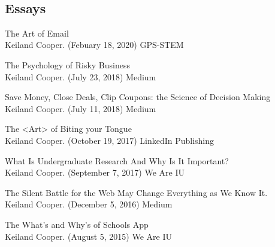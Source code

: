 \documentclass[10pt]{cooperCV2}
\begin{document}
%	






\needspace{\headerpush}
\myRule{\columnwidth}{1pt}\\

 
\subsection{Essays} 
\begin{etaremune}[itemindent=-1.5\bibhang, topsep=0pt,
				   itemsep=\bibsep,partopsep=0pt,parsep=0pt,leftmargin={\bibhang+\widthof{[999]}}] 
    
    \item The Art of Email \\
     Keiland Cooper. (Febuary 18, 2020) GPS-STEM
     
	
    \item The Psychology of Risky Business \\
     Keiland Cooper. (July 23, 2018) Medium
     
	
    \item Save Money, Close Deals, Clip Coupons: the Science of Decision Making \\
     Keiland Cooper. (July 11, 2018) Medium
     
	
    \item The <Art> of Biting your Tongue \\
     Keiland Cooper. (October 19, 2017) LinkedIn Publishing
     
	
    \item What Is Undergraduate Research And Why Is It Important? \\
     Keiland Cooper. (September 7, 2017) We Are IU
     
	
    \item The Silent Battle for the Web May Change Everything as We Know It. \\
     Keiland Cooper. (December 5, 2016) Medium
     
	
    \item The What’s and Why’s of Schools App \\
     Keiland Cooper. (August 5, 2015) We Are IU
     
	

\end{etaremune}
\end{document}
